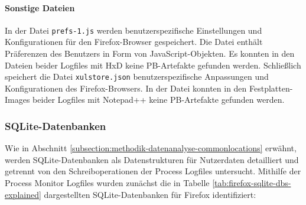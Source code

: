 \begin{appendices}
\paragraph*{Sonstige Dateien}
In der Datei \texttt{prefs-1.js} werden benutzerspezifische Einstellungen und Konfigurationen für den Firefox-Browser gespeichert. Die Datei enthält Präferenzen des Benutzers in Form von JavaScript-Objekten. Es konnten in den Dateien beider Logfiles mit HxD keine PB-Artefakte gefunden werden. 
Schließlich speichert die Datei \texttt{xulstore.json} benutzerspezifische Anpassungen und Konfigurationen des Firefox-Browsers. In der Datei konnten in den Festplatten-Images beider Logfiles mit Notepad++ keine PB-Artefakte gefunden werden. \cite{mozillazine.29.12.2022}

\subsubsection*{SQLite-Datenbanken}
\label{appendix:firefox-sqlite}
Wie in Abschnitt \ref{subsection:methodik-datenanalyse-commonlocations} erwähnt, werden SQLite-Datenbanken als Datenstrukturen für Nutzerdaten detailliert und getrennt von den Schreiboperationen der Process Logfiles untersucht. Mithilfe der Process Monitor Logfiles wurden zunächst die in Tabelle \ref{tab:firefox-sqlite-dbs-explained} dargestellten SQLite-Datenbanken für Firefox identifiziert:
\begin{table}[h!]
\centering
\caption{Firefox: Veränderte SQLite-Datenbanken und deren Verwendungszwecke}
\label{tab:firefox-sqlite-dbs-explained}
\end{table}
\end{appendices}
